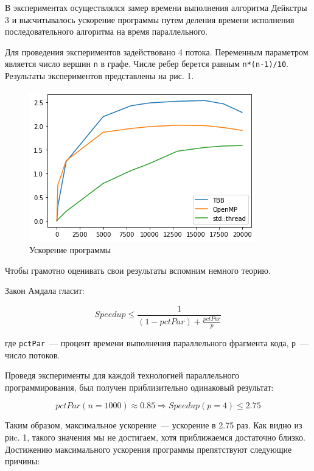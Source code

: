 \documentclass{article}
\begin{document}
\par В экспериментах осуществлялся замер времени выполнения алгоритма Дейкстры 3 и высчитывалось ускорение программы путем деления времени исполнения последовательного алгоритма на время параллельного. 

\par Для проведения экспериментов задействовано 4 потока. Переменным параметром является число вершин \verb|n| в графе. Числе ребер берется равным \verb|n*(n-1)/10|. Результаты экспериментов представлены на рис. 1.

\begin{figure}[h]
\centering
\includegraphics[scale=1.1]{speedup}
\caption{Ускорение программы}
\end{figure}

\newpage

\par Чтобы грамотно оценивать свои результаты вспомним немного теорию. 

\par Закон Амдала гласит: 

\begin{equation}
Speedup \leq \frac{1}{(1-pctPar) + \frac{pctPar}{p}}
\end{equation} 

где \verb|pctPar|~--- процент времени выполнения параллельного фрагмента кода, \verb|p|~--- число потоков. 

\par Проведя эксперименты для каждой технологией параллельного программирования, был получен приблизительно одинаковый результат:

\begin{equation}
pctPar(n=1000)\approx 0.85 \Rightarrow Speedup(p = 4) \leq 2.75
\end{equation}

\par Таким образом, максимальное ускорение~--- ускорение в 2.75 раз. Как видно из риc. 1, такого значения мы не достигаем, хотя приближаемся достаточно близко. Достижению максимального ускорения программы препятствуют следующие причины: 
\end{document}
